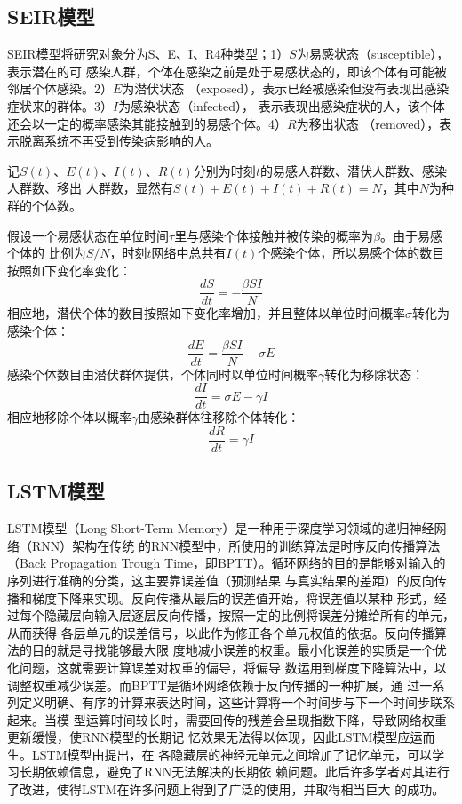 \documentclass[lang=cn,11pt,a4paper,cite=authoryear]{elegantpaper}
\begin{document}
\subsection{SEIR模型}
SEIR模型将研究对象分为S、E、I、R4种类型；1）$S$为易感状态（susceptible），表示潜在的可
感染人群，个体在感染之前是处于易感状态的，即该个体有可能被邻居个体感染。2）$E$为潜伏状态
（exposed），表示已经被感染但没有表现出感染症状来的群体。3）$I$为感染状态（infected），
表示表现出感染症状的人，该个体还会以一定的概率感染其能接触到的易感个体。4）$R$为移出状态
（removed），表示脱离系统不再受到传染病影响的人。

记$S(t)$、$E(t)$、$I(t)$、$R(t)$分别为时刻$t$的易感人群数、潜伏人群数、感染人群数、移出
人群数，显然有$S(t)+E(t)+I(t)+R(t)=N$，其中$N$为种群的个体数。

假设一个易感状态在单位时间$\tau$里与感染个体接触并被传染的概率为$\beta$。由于易感个体的
比例为$S/N$，时刻$t$网络中总共有$I(t)$个感染个体，所以易感个体的数目按照如下变化率变化：
\begin{equation}
\frac{dS}{dt}=-\frac{\beta SI}{N}
\end{equation}
相应地，潜伏个体的数目按照如下变化率增加，并且整体以单位时间概率$\sigma$转化为感染个体：
\begin{equation}
\frac{dE}{dt}=\frac{\beta SI}{N}-\sigma E
\end{equation}
感染个体数目由潜伏群体提供，个体同时以单位时间概率$\gamma$转化为移除状态：
\begin{equation}
\frac{dI}{dt}=\sigma E-\gamma I
\end{equation}
相应地移除个体以概率$\gamma$由感染群体往移除个体转化：
\begin{equation}
\frac{dR}{dt}=\gamma I
\end{equation}
\subsection{LSTM模型}
LSTM模型（Long Short-Term Memory）是一种用于深度学习领域的递归神经网络（RNN）架构在传统
的RNN模型中，所使用的训练算法是时序反向传播算法（Back Propagation Trough 
Time，即BPTT）。循环网络的目的是能够对输入的序列进行准确的分类，这主要靠误差值（预测结果
与真实结果的差距）的反向传播和梯度下降来实现。反向传播从最后的误差值开始，将误差值以某种
形式，经过每个隐藏层向输入层逐层反向传播，按照一定的比例将误差分摊给所有的单元，从而获得
各层单元的误差信号，以此作为修正各个单元权值的依据。反向传播算法的目的就是寻找能够最大限
度地减小误差的权重。最小化误差的实质是一个优化问题，这就需要计算误差对权重的偏导，将偏导
数运用到梯度下降算法中，以调整权重减少误差。而BPTT是循环网络依赖于反向传播的一种扩展，通
过一系列定义明确、有序的计算来表达时间，这些计算将一个时间步与下一个时间步联系起来。当模
型运算时间较长时，需要回传的残差会呈现指数下降，导致网络权重更新缓慢，使RNN模型的长期记
忆效果无法得以体现，因此LSTM模型应运而生。LSTM模型由\cite{hochreiter1997lstm}提出，在
各隐藏层的神经元单元之间增加了记忆单元，可以学习长期依赖信息，避免了RNN无法解决的长期依
赖问题。此后许多学者对其进行了改进，使得LSTM在许多问题上得到了广泛的使用，并取得相当巨大
的成功\citep{gers2000learning, graves2005bidirectional, graves2005framewise, 
schmidhuber2007training, bayer2009evolving, schaul2010pybrain, 
graves2013hybrid, bayer2014Learning}。
\end{document}
